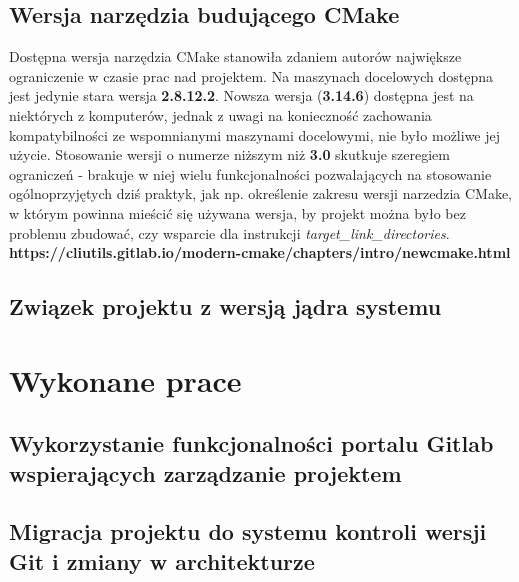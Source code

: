 \section{Wersja narzędzia budującego CMake}
Dostępna wersja narzędzia CMake stanowiła zdaniem autorów największe ograniczenie w czasie prac nad projektem. Na maszynach docelowych dostępna jest jedynie stara wersja \textbf{2.8.12.2}. Nowsza wersja (\textbf{3.14.6}) dostępna jest na niektórych z komputerów, jednak z uwagi na konieczność zachowania kompatybilności ze wspomnianymi maszynami docelowymi, nie było możliwe jej użycie. Stosowanie wersji o numerze niższym niż \textbf{3.0} skutkuje szeregiem ograniczeń - brakuje w niej wielu funkcjonalności pozwalających na stosowanie ogólnoprzyjętych dziś praktyk, jak np. określenie zakresu wersji narzedzia CMake, w którym powinna mieścić się używana wersja, by projekt można było bez problemu zbudować, czy wsparcie dla instrukcji \textit{target\_link\_directories}. \textbf{https://cliutils.gitlab.io/modern-cmake/chapters/intro/newcmake.html}

\section{Związek projektu z wersją jądra systemu}



\chapter{Wykonane prace}
\label{cha:prace}

\section{Wykorzystanie funkcjonalności portalu Gitlab wspierających zarządzanie projektem}
\section{Migracja projektu do systemu kontroli wersji Git i zmiany w architekturze}
